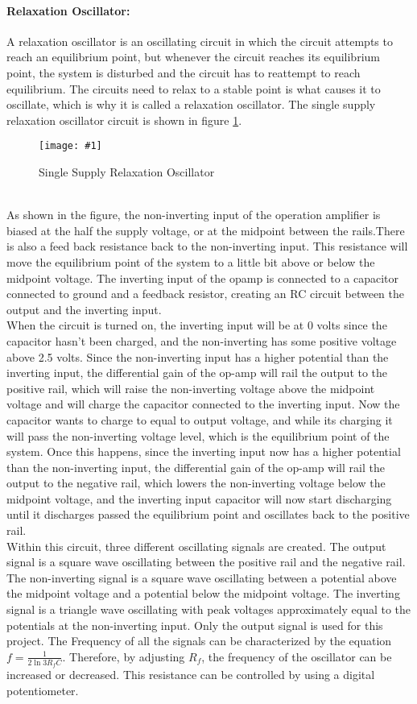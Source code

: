 \documentclass[12pt]{article}
\newcommand{\myfig}[2] {
    \label{page:#1}
    \begin{figure}[ht]
        \begin{framed}
        \centering
          \texttt{[image: \#1]}\\
          \caption{#2}\label{fig:#1}
        \end{framed}
    \end{figure}
}
\begin{document}
\paragraph{Relaxation Oscillator:} A relaxation oscillator is an oscillating circuit in which the circuit attempts to reach an equilibrium point, but whenever the circuit reaches its equilibrium point, the system is disturbed and the circuit has to reattempt to reach equilibrium. The circuits need to relax to a stable point is what causes it to oscillate, which is why it is called a relaxation oscillator. The single supply relaxation oscillator circuit is shown in figure \ref{fig:part2}.\myfig{part2}{Single Supply Relaxation Oscillator}\\
\indent As shown in the figure, the non-inverting input of the operation amplifier is biased at the half the supply voltage, or at the midpoint between the rails.There is also a feed back resistance back to the non-inverting input. This resistance will move the equilibrium point of the system to a little bit above or below the midpoint voltage. The inverting input of the opamp is connected to a capacitor connected to ground and a feedback resistor, creating an RC circuit between the output and the inverting input.\\
\indent When the circuit is turned on, the inverting input will be at 0 volts since the capacitor hasn't been charged, and the non-inverting has some positive voltage above 2.5 volts. Since the non-inverting input has a higher potential than the inverting input, the differential gain of the op-amp will rail the output to the positive rail, which will raise the non-inverting voltage above the midpoint voltage and will charge the capacitor connected to the inverting input. Now the capacitor wants to charge to equal to output voltage, and while its charging it will pass the non-inverting voltage level, which is the equilibrium point of the system. Once this happens, since the inverting input now has a higher potential than the non-inverting input, the differential gain of the op-amp will rail the output to the negative rail, which lowers the non-inverting voltage below the midpoint voltage, and the inverting input capacitor will now start discharging until it discharges passed the equilibrium point and oscillates back to the positive rail. \\
\indent Within this circuit, three different oscillating signals are created. The output signal is a square wave oscillating between the positive rail and the negative rail. The non-inverting signal is a square wave oscillating between a potential above the midpoint voltage and a potential below the midpoint voltage. The inverting signal is a triangle wave oscillating with peak voltages approximately equal to the potentials at the non-inverting input. Only the output signal is used for this project. The Frequency of all the signals can be characterized by the equation $f = \frac{1}{2\ln{3}R_f C}$. Therefore, by adjusting $R_f$, the frequency of the oscillator can be increased or decreased. This resistance can be controlled by using a digital potentiometer.
\end{document}
